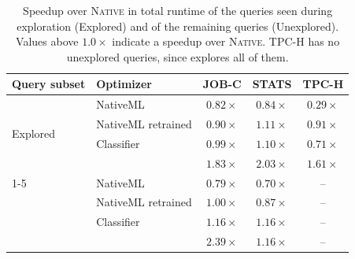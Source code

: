 \begin{table}[t]
	\centering
	\caption{Speedup over \textsc{Native} in total runtime of the queries seen during
		exploration (Explored) and of the remaining queries (Unexplored). Values above
		$1.0\times$ indicate a speedup over \textsc{Native}. TPC-H has no unexplored
		queries, since \system explores all of them.}
	\label{tab:speedups}
	\begin{tabular}{llccc}
		\toprule
		\textbf{Query subset} & \textbf{Optimizer} & \textbf{JOB-C} & \textbf{STATS} & \textbf{TPC-H} \\
		\midrule
		\multirow{4}{*}{Explored}   & NativeML           & $0.82\times$ & $0.84\times$ & $0.29\times$ \\
		                            & NativeML retrained & $0.90\times$ & $1.11\times$ & $0.91\times$ \\
		                            & Classifier         & $0.99\times$ & $1.10\times$ & $0.71\times$ \\
		                            & \system            & $\mathbf{1.83\times}$ & $\mathbf{2.03\times}$ & $\mathbf{1.61\times}$ \\
		\cmidrule(lr){1-5}
		\multirow{4}{*}{Unexplored} & NativeML           & $0.79\times$ & $0.70\times$ & -- \\
		                            & NativeML retrained & $1.00\times$ & $0.87\times$ & -- \\
		                            & Classifier         & $1.16\times$ & $1.16\times$ & -- \\
		                            & \system            & $\mathbf{2.39\times}$ & $\mathbf{1.16\times}$ & -- \\
		\bottomrule
	\end{tabular}
\end{table}
